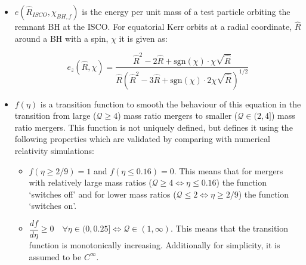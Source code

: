 \begin{itemize}
        \item $e(\hat{R}_{ISCO}, \chi_{BH, f})$ is the energy per unit mass of a test
            particle orbiting the remnant BH at the ISCO. For equatorial Kerr orbits at
            a radial coordinate, $\hat{R}$ around a BH with a spin, $\chi$ it
            is given as:

            \begin{equation}
                e_z(\hat{R}, \chi) =
                    \dfrac
                    {
                        \hat{R}^2 - 2 \hat{R} + \mathrm{sgn}(\chi) \cdot \chi
                        \sqrt{\hat{R}}
                    }
                    {
                        \hat{R}
                        (
                            \hat{R}^2 - 3\hat{R} + \mathrm{sgn}(\chi) \cdot 2 \chi
                            \sqrt{\hat{R}}
                        )^{1/2}
                    }
                \label{eq:E_boyerlindquist}
            \end{equation}

        \item $f(\eta)$ is a transition function to smooth the behaviour of this
            equation in the transition from large ($\mathcal{Q} \geq 4$) mass ratio
            mergers to smaller ($\mathcal{Q} \in (2, 4]$) mass ratio mergers. This
            function is not uniquely defined, but \cite{pannarale_2013} defines it using
            the following properties which are validated by comparing with numerical
            relativity simulations:

            \begin{itemize}

                \item $f(\eta \geq 2/9) = 1$ and $f(\eta \leq 0.16) = 0$. This means
                    that for mergers with relatively large mass ratios ($\mathcal{Q}
                    \geq 4 \Leftrightarrow \eta \leq 0.16$) the function `switches off'
                    and for lower mass ratios ($\mathcal{Q} \leq 2 \Leftrightarrow
                    \eta \geq 2/9$) the function `switches on'.

                \item  $\dfrac{df}{d\eta} \geq 0 \quad \forall \eta \in (0, 0.25]
                    \Leftrightarrow \mathcal{Q} \in (1, \infty) $. This means that the
                    transition function is monotonically increasing. Additionally
                    for simplicity, it is assumed to be $C^\infty$.

            \end{itemize}


\end{itemize}
